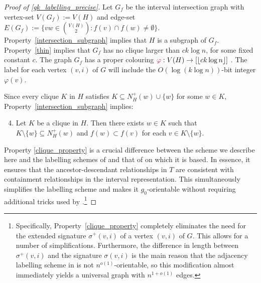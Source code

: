 \documentclass{patmorin}
\makeatletter
\def\mathcolor#1#{\@mathcolor{#1}}
\def\@mathcolor#1#2#3{%
  \protect\leavevmode
  \begingroup
    \color#1{#2}#3%
  \endgroup
}
\newcommand{\mathdefin}[1]{\mathcolor{brightmaroon}{#1}}
\newcommand{\Oh}{O}
\makeatother
\begin{document}
\begin{proof}[Proof of \cref{gk_labelling_precise}]
  Let $G_f$ be the interval intersection graph with vertex-set $V(G_f):=V(H)$ and edge-set $E(G_f):=\{vw\in\binom{V(H)}{2}:f(v)\cap f(w)\neq\emptyset\}$.
  Property~\ref{intersection_subgraph} implies that $H$ is a subgraph of $G_f$. Property~\ref{thin} implies that $G_f$ has no clique larger than $ck\log n$, for some fixed constant $c$.
  The graph $G_f$ has a proper colouring $\mathdefin{\varphi}:V(H)\to[\lfloor ck\log n\rfloor]$ \cite{gilmore.hoffman:characterization}.
  The label for each vertex $(v,i)$ of $G$ will include the $\Oh(\log (k\log n))$-bit integer $\varphi(v)$.

  Since every clique $K$ in $H$ satisfies $K\subseteq N^+_H(w)\cup\{w\}$ for some $w\in K$, Property~\ref{intersection_subgraph} implies:
  \begin{enumerate}[nosep,label=(I\arabic*)]\setcounter{enumi}{3}
    \item\label{clique_property} Let $K$ be a clique in $H$.  Then there exists $w\in K$ such that $K\setminus\{w\}\subseteq N^+_H(w)$ and $f(w)\subset f(v)$ for each $v\in K\setminus\{w\}$.  
  \end{enumerate}
  Property \ref{clique_property} is a crucial difference between the scheme we describe here and the labelling schemes of \citet{dujmovic.esperet.ea:adjacency} and that of \citet{gavoille.labourel:shorter} on which it is based.  In essence, it ensures that the ancestor-descendant relationships in $T$ are consistent with containment relationships in the interval representation.  This simultaneously simplifies the labelling scheme and makes it $g_0$-orientable without requiring additional tricks used by \citet{EJM23}.\footnote{Specifically, Property~\ref{clique_property} completely eliminates the need for the extended signature $\sigma^+(v,i)$ of a vertex $(v,i)$ of $G$.  This allows for a number of simplifications.  Furthermore, the difference in length between $\sigma^+(v,i)$ and the signature $\sigma(v,i)$ is the main reason that the adjacency labelling scheme in \cite{dujmovic.esperet.ea:adjacency} is not $n^{o(1)}$-orientable, so this modification almost immediately yields a universal graph with $n^{1+o(1)}$ edges.}
  


\end{proof}
\end{document}
